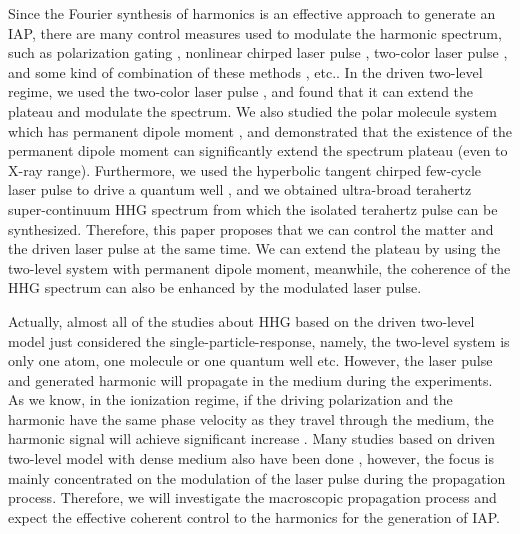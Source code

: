 \documentclass[10pt,letterpaper]{article}
\begin{document}
Since the Fourier synthesis of harmonics is an effective approach to generate an IAP, there are many control measures used to modulate the harmonic spectrum, such as polarization gating \cite{Corkum-PRL-1993,Sansone-Polarization-gate-Nature-2006}, nonlinear chirped laser pulse \cite{Carrera-Chirp-PRA-2007}, two-color laser pulse \cite{ZengZhinan-Two-Color-PRL-2007}, and some kind of combination of these methods \cite{ChangZenghu-Combination-PRA-2007}, etc.. In the driven two-level regime, we used the two-color laser pulse \cite{Gong-Two-Level-Two-Color-JMO-1999,WANG-ZHONG-YANG-Two-Level-Attosecond-generation-1999,LiuChengpu-Two-Level-PRA-2004}, and found that it can extend the plateau and modulate the spectrum. We also studied the polar molecule system which has permanent dipole moment \cite{YangWeifeng-Two-Level-PLA-2007}, and demonstrated that the existence of the permanent dipole moment can significantly extend the spectrum plateau (even to X-ray range). Furthermore, we used the hyperbolic tangent chirped few-cycle laser pulse to drive a quantum well \cite{CuiNi2010NJP-wavelet}, and we obtained ultra-broad terahertz super-continuum HHG spectrum from which the isolated terahertz pulse can be synthesized. Therefore, this paper proposes that we can control the matter and the driven laser pulse at the same time. We can extend the plateau by using the two-level system with permanent dipole moment, meanwhile, the coherence of the HHG spectrum can also be enhanced by the modulated laser pulse. 

Actually, almost all of the studies about HHG based on the driven two-level model just considered the single-particle-response, namely, the two-level system is only one atom, one molecule or one quantum well etc.  However, the laser pulse and generated harmonic will propagate in the medium during the experiments. As we know, in the ionization regime, if the driving polarization and the harmonic have the same phase velocity as they travel through the medium, the harmonic signal will achieve significant increase \cite{2009Review}. Many studies based on driven two-level model with dense medium also have been done \cite{Pan-Ruiqin-Permanent-dipole-moment-2011,Xiao-Jian-PRA-2002,Xia-Keyu-OE-2005,Kalosha-Two-Level-PRL-1999,Ziolkowski-Two-Level-Method-PRA-1995}, however, the focus is mainly concentrated on the modulation of the laser pulse during the propagation process.  Therefore, we will investigate the macroscopic propagation process and expect the effective coherent control to the harmonics for the generation of IAP.
\end{document}
